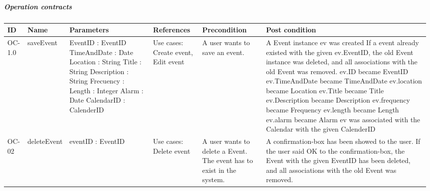 \subparagraph{Operation contracts} \mbox{} 
  
  \begin{table}[ht]
    \begin{tabular}{|l|l|p{90px}|p{50px}|p{90px}|p{90px}|}
        \hline
        ID & Name & Parameters & References & Precondition & Post condition
        \\ \hline
        OC-1.0 & saveEvent 
        &
			EventID : EventID
			TimeAndDate : Date 
			Location : String 
			Title : String 
			Description : String 
			Frecuency : 
			Length : Integer
			Alarm : Date 
			CalendarID : CalenderID
        &
        Use cases: Create event, Edit event
        &
        A user wants to save an event.
        &
        A Event instance ev was created
		If a event already existed with the given ev.EventID, the old Event instance was deleted, and all associations with the old Event was removed.
		ev.ID became EventID
		ev.TimeAndDate became TimeAndDate
		ev.location became Location       
		ev.Title became Title
		ev.Description became Description
		ev.frequency became Frequency        
		ev.length became Length
		ev.alarm became Alarm        
        ev was associated with the Calendar with the given CalenderID
        \\ \hline        
        OC-02 & deleteEvent 
        &
        	eventID : EventID
        &
        Use cases: Delete event
        &
        A user wants to delete a Event.
        The event has to exist in the system.
        &
        A confirmation-box has been showed to the user.
        If the user said OK to the confirmation-box, the Event with the given EventID has been deleted, and all associations with the old Event was removed.
        \\ \hline
    \end{tabular}
\end{table}